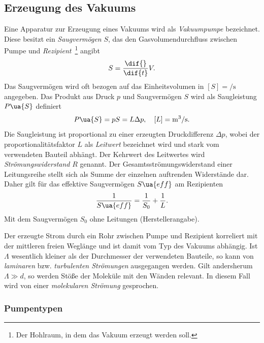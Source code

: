 \subsection{Erzeugung des Vakuums}
Eine Apparatur zur Erzeugung eines Vakuums wird als \emph{Vakuumpumpe} bezeichnet. Diese besitzt ein
\emph{Saugvermögen} $S$, das den Gasvolumendurchfluss zwischen Pumpe und \emph{Rezipient}~\footnote{Der Hohlraum, in dem das Vakuum erzeugt werden soll.}
angibt
\begin{equation}
  S = \frac{\dif{}}{\dif{t}} V.
\end{equation}
Das Saugvermögen wird oft bezogen auf das Einheitsvolumen in $[{S}] = \si{\per \second}$ angegeben.
Das Produkt aus Druck $p$ und Saugvermögen $S$ wird als Saugleistung $P\ua{S}$ definiert
\begin{equation}
  P\ua{S} = p S = L \Delta p , \quad [L] = \si{\meter^3 \per \second}.
\end{equation}
Die Saugleistung ist proportional zu einer erzeugten Druckdifferenz $\Delta p$,
wobei der proportionalitätsfaktor $L$ als \emph{Leitwert} bezeichnet wird und stark vom verwendeten Bauteil abhängt.
Der Kehrwert des Leitwertes wird \emph{Strömungswiderstand} $R$ genannt. Der Gesamtsströmungswiderstand einer Leitungsreihe
stellt sich als Summe der einzelnen auftrenden Widerstände dar. Daher gilt für das effektive Saugvermögen $S\ua{eff}$ am Rezipienten
\begin{equation}
 \frac{1}{S\ua{eff}} = \frac{1}{S_0} + \frac{1}{L}.
 \label{eq: effektives_saugvermögen}
\end{equation}
Mit dem Saugvermögen $S_0$ ohne Leitungen (Herstellerangabe).

Der erzeugte Strom durch ein Rohr zwischen Pumpe und Rezipient korreliert mit der mittleren freien Weglänge
und ist damit vom Typ des Vakuums abhängig. Ist $\Lambda$ wesentlich
kleiner als der Durchmesser der verwendeten Bauteile, so kann von \emph{laminaren} bzw. \emph{turbulenten Strömungen} ausgegangen werden. Gilt andersherum
$\Lambda \gg d$, so werden Stöße der Moleküle mit den Wänden relevant. In diesem Fall wird von einer \emph{molekularen Strömung} gesprochen.


\subsubsection{Pumpentypen}



